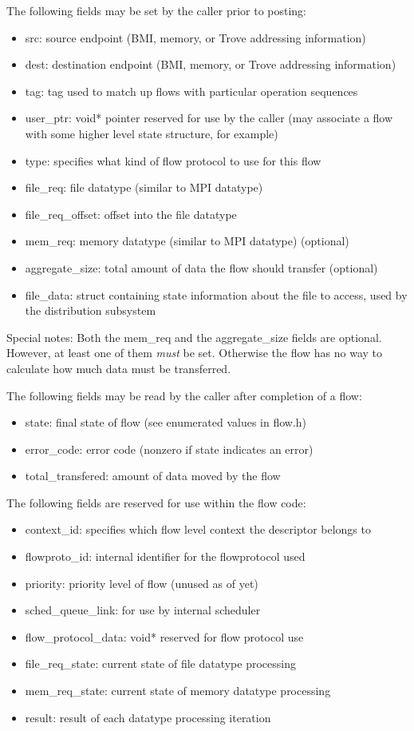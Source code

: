 \documentclass[12pt]{article} %
\begin{document}
The following fields may be set by the caller prior to posting:
\begin{itemize}
\item src: source endpoint (BMI, memory, or Trove addressing information)
\item dest: destination endpoint (BMI, memory, or Trove addressing information)
\item tag: tag used to match up flows with particular operation sequences
\item user\_ptr: void* pointer reserved for use by the caller (may associate a 
flow with some higher level state structure, for example)
\item type: specifies what kind of flow protocol to use for this flow
\item file\_req: file datatype (similar to MPI datatype)
\item file\_req\_offset: offset into the file datatype
\item mem\_req: memory datatype (similar to MPI datatype) (optional)
\item aggregate\_size: total amount of data the flow should transfer (optional)
\item file\_data: struct containing state information about the file to access, used by the distribution subsystem
\end{itemize}

Special notes:  Both the mem\_req and the aggregate\_size fields are optional.
However, at least one of them \emph{must} be set.  Otherwise the flow has 
no way to calculate how much data must be transferred.

The following fields may be read by the caller after completion of a flow:
\begin{itemize}
\item state: final state of flow (see enumerated values in flow.h)
\item error\_code: error code (nonzero if state indicates an error)
\item total\_transfered: amount of data moved by the flow
\end{itemize}

The following fields are reserved for use within the flow code:
\begin{itemize}
\item context\_id: specifies which flow level context the descriptor belongs to
\item flowproto\_id: internal identifier for the flowprotocol used
\item priority: priority level of flow (unused as of yet)
\item sched\_queue\_link: for use by internal scheduler
\item flow\_protocol\_data: void* reserved for flow protocol use
\item file\_req\_state: current state of file datatype processing
\item mem\_req\_state: current state of memory datatype processing
\item result: result of each datatype processing iteration
\end{itemize}
\end{document}
